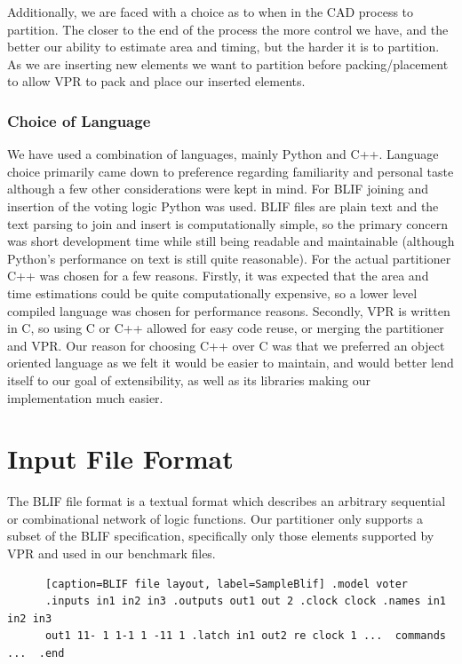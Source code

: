 \documentclass[12pt,final,oneside]{dwThesis} %
\begin{document}
   Additionally, we are faced with a choice as to when in the \gls{CAD} process
   to partition. The closer to the end of the process the more control we have,
   and the better our ability to estimate area and timing, but the harder it is
   to partition. As we are inserting new elements we want to partition before
   packing/placement to allow \gls{VPR} to pack and place our inserted
   elements.

   \subsubsection{Choice of Language} We have used a combination of languages,
   mainly Python and C++. Language choice primarily came down to preference
   regarding familiarity and personal taste although a few other considerations
   were kept in mind.  For \gls{BLIF} joining and insertion of the voting logic
   Python was used. \gls{BLIF} files are plain text and the text parsing to
   join and insert is computationally simple, so the primary concern was short
   development time while still being readable and maintainable (although
   Python's performance on text is still quite
   reasonable)\cite{LanguageBenchmark}.  For the actual partitioner C++ was
   chosen for a few reasons. Firstly, it was expected that the area and time
   estimations could be quite computationally expensive, so a lower level
   compiled language was chosen for performance
   reasons\cite{LanguageBenchmark}. Secondly, \gls{VPR} is written in C, so
   using C or C++ allowed for easy code reuse, or merging the partitioner and
   \gls{VPR}. Our reason for choosing C++ over C was that we preferred an
   object oriented language as we felt it would be easier to maintain, and
   would better lend itself to our goal of extensibility, as well as its
   libraries making our implementation much easier.


   \section{Input File Format}
   \label{secBlif} The \gls{BLIF} file format is a
   textual format which describes an arbitrary sequential or combinational
   network of logic functions\cite{BLIF}.  Our partitioner only supports a
   subset of the \gls{BLIF} specification, specifically only those elements
   supported by \gls{VPR} and used in our benchmark files.

   \begin{lstlisting}
      [caption=BLIF file layout, label=SampleBlif] .model voter
      .inputs in1 in2 in3 .outputs out1 out 2 .clock clock .names in1 in2 in3
      out1 11- 1 1-1 1 -11 1 .latch in1 out2 re clock 1 ...  commands ...  .end

   \end{lstlisting}
\end{document}
